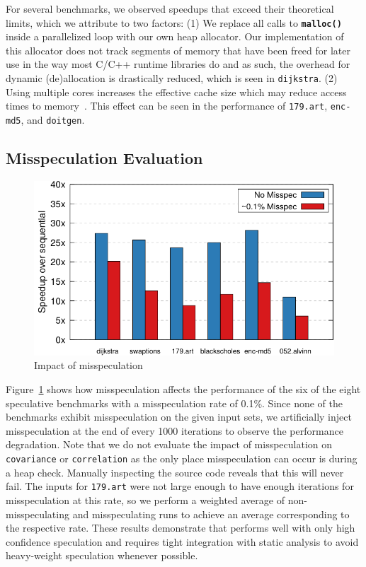 For several benchmarks, we observed speedups that exceed their theoretical
limits, which we attribute to two factors:
(1) We replace all calls to \texttt{\textbf{malloc()}} inside a parallelized
loop with our own heap allocator. Our implementation of this allocator
does not track segments of memory that have been freed for later use in the
way most C/C++ runtime libraries do and as such, the overhead for dynamic
(de)allocation is drastically reduced, which is seen in \texttt{dijkstra}.
(2) Using multiple cores increases the effective cache size which may
reduce access times to memory~\cite{jeon:11:oopsla}. This effect can be
seen in the performance of \texttt{179.art}, \texttt{enc-md5}, and
\texttt{doitgen}.

\subsection{Misspeculation Evaluation}
\begin{figure}[htp]
  \includegraphics[width=\columnwidth]{figures/misspec-crop}
  \caption{Impact of misspeculation}
  \label{fig:misspec}
\end{figure}
Figure~\ref{fig:misspec} shows how misspeculation affects the
performance of the six of the eight speculative benchmarks with a misspeculation rate of
0.1\%.
Since none of the benchmarks exhibit misspeculation on the
given input sets, we artificially inject misspeculation at the end of
every 1000 iterations to observe the performance degradation.
Note that we do not evaluate the impact of misspeculation on \texttt{covariance}
or \texttt{correlation} as the only place misspeculation can occur is
during a heap check. Manually inspecting the source code reveals that this
will never fail.
The inputs for \texttt{179.art} were not large enough to have
enough iterations for misspeculation at this rate, so we perform a
weighted average of non-misspeculating and misspeculating runs to achieve
an average corresponding to the respective rate.
These results demonstrate that \name performs well with only high
confidence speculation and requires tight integration with static analysis
to avoid heavy-weight speculation whenever possible.

